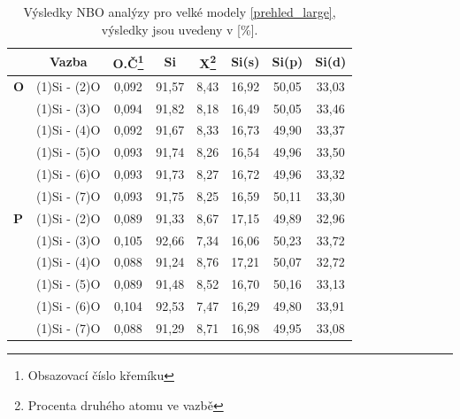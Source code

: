 \documentclass[
digital, %
table,   %
lof,     %
lot,     %
oneside,
]{fithesis3}
\begin{document}
\begin{table}
\caption{Výsledky NBO analýzy pro velké modely \ref{prehled_large}, výsledky jsou uvedeny v [\%].}
\begin{minipage}{\textwidth}
\begin{center}
\begin{tabular}{|l|c|c|c|c|c|c|c|}
\hline
\label{nbo_large}&  Vazba & O.Č\footnote{Obsazovací číslo křemíku} & Si & X\footnote{Procenta druhého atomu ve  vazbě} & Si(s) & Si(p) &Si(d) \\ \hline
\textbf{O} & (1)Si - (2)O  & 0,092 & 91,57   & 8,43   & 16,92   & 50,05   & 33,03   \\ \hline
& (1)Si - (3)O  & 0,094 & 91,82   & 8,18   & 16,49   & 50,05   & 33,46   \\ \hline
&  (1)Si - (4)O  & 0,092 & 91,67   & 8,33   & 16,73   & 49,90   & 33,37   \\ \hline
& (1)Si - (5)O & 0,093 & 91,74   & 8,26   & 16,54   & 49,96   & 33,50   \\ \hline
&  (1)Si - (6)O & 0,093 & 91,73   & 8,27   & 16,72   & 49,96   & 33,32   \\ \hline
& (1)Si - (7)O& 0,093 & 91,75   & 8,25   & 16,59   & 50,11   & 33,30   \\ \hline
\textbf{P}& (1)Si - (2)O  & 0,089 & 91,33   & 8,67   & 17,15   & 49,89   & 32,96   \\ \hline
&  (1)Si - (3)O  & 0,105 & 92,66   & 7,34   & 16,06   & 50,23   & 33,72   \\ \hline
&  (1)Si - (4)O   & 0,088 & 91,24   & 8,76   & 17,21   & 50,07   & 32,72   \\ \hline
& (1)Si - (5)O  & 0,089 & 91,48   & 8,52   & 16,70   & 50,16   & 33,13   \\ \hline
&  (1)Si - (6)O & 0,104 & 92,53   & 7,47   & 16,29   & 49,80   & 33,91   \\ \hline
&  (1)Si - (7)O & 0,088 & 91,29   & 8,71   & 16,98   & 49,95   & 33,08   \\ \hline
\end{tabular}\end{center}\end{minipage}\end{table}
\end{document}
